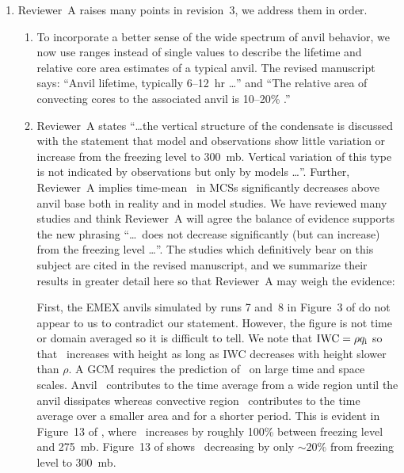 \documentclass[12pt,twoside]{article}
\begin{document}
\begin{enumerate}
\item Reviewer~A raises many points in revision~3, we address them in
order.

\begin{enumerate}
\item To incorporate a better sense of the wide spectrum of anvil 
behavior, we now use ranges instead of single values to describe the 
lifetime and relative core area estimates of a typical anvil.
The revised manuscript says:
``Anvil lifetime, typically 6--12~hr \cite[]{ALV88,LeH80} \ldots'' and
``The relative area of convecting cores to the associated anvil is
10--20\% \cite[]{FDR90,LeH80}.''

\item Reviewer~A states ``\ldots the vertical structure of the
condensate is discussed with the statement that model and observations
show little variation or increase from the freezing level to
300~mb. Vertical variation of this type is not indicated by
observations but only by models \ldots''.
Further, Reviewer~A implies time-mean \qi\ in MCSs significantly
decreases above anvil base both in reality and in model studies.
We have reviewed many studies and think Reviewer~A will agree the
balance of evidence supports the new phrasing ``\ldots \qc\ does not 
decrease significantly (but can increase) from the freezing level
\ldots''.     
The studies which definitively bear on this subject are cited in the
revised manuscript, and we summarize their results in greater detail
here so that Reviewer~A may weigh the evidence:

First, the EMEX anvils simulated by runs 7 and~8 in Figure~3 of
\cite{TLS96} do not appear to us to contradict our statement.
However, the figure is not time or domain averaged so it is difficult
to tell.
We note that $\mbox{\textrm{IWC}} = \rho \mbox{$q_\mathrm{i}$}$ so that \qi\ increases with height as
long as IWC decreases with height slower than $\rho$.
A GCM requires the prediction of \qi\ on large time and space scales.
Anvil \qi\ contributes to the time average from a wide region until
the anvil dissipates whereas convective region \qi\ contributes to the
time average over a smaller area and for a shorter period.   
This is evident in Figure~13 of \cite{GMK96}, where \qi\ increases by
roughly 100\% between freezing level and 275~mb.
Figure~13 of \cite{SLT94} shows \qi\ decreasing by only $\sim 20\%$
from freezing level to 300~mb. 


\end{enumerate}
\end{enumerate}
\end{document}
